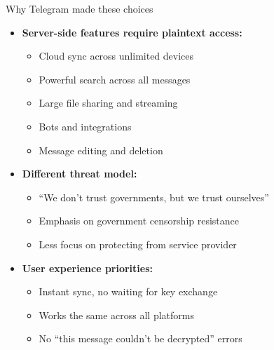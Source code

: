 \documentclass[aspectratio=169, lualatex, handout]{beamer}
\begin{document}
\begin{frame}{Why Telegram made these choices}
	\begin{itemize}
		\item \textbf{Server-side features require plaintext access:}
		      \begin{itemize}
			      \item Cloud sync across unlimited devices
			      \item Powerful search across all messages
			      \item Large file sharing and streaming
			      \item Bots and integrations
			      \item Message editing and deletion
		      \end{itemize}
		\item \textbf{Different threat model:}
		      \begin{itemize}
			      \item ``We don't trust governments, but we trust ourselves''
			      \item Emphasis on government censorship resistance
			      \item Less focus on protecting from service provider
		      \end{itemize}
		\item \textbf{User experience priorities:}
		      \begin{itemize}
			      \item Instant sync, no waiting for key exchange
			      \item Works the same across all platforms
			      \item No ``this message couldn't be decrypted'' errors
		      \end{itemize}
	\end{itemize}
\end{frame}
\end{document}
